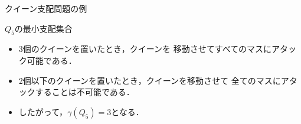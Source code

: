 \documentclass[dvipdfmx,10pt]{beamer}
\begin{document}
 
%
%

\begin{frame}{クイーン支配問題の例}
  \begin{exampleblock}{$Q_{5}$の最小支配集合}
  \begin{center}
   \scalebox{1.3}{
   
   }
  \end{center}
 \end{exampleblock}
 \begin{itemize}
  \item 3個のクイーンを置いたとき，クイーンを
	移動させてすべてのマスにアタック可能である．
  \item 2個以下のクイーンを置いたとき，クイーンを移動させて
	全てのマスにアタックすることは不可能である．
  \item したがって，$\gamma(Q_{5})=3$となる．
 \end{itemize}
\end{frame}


%
%
\end{document}
